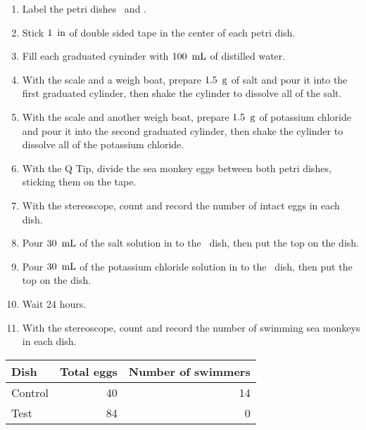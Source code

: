 \documentclass[12pt]{article}
\begin{document}
\begin{enumerate}
    \item Label the petri dishes \control\ and \test.
    \item Stick $1\operatorname{\ in}$ of double sided tape in the center of each petri dish.
    \item Fill each graduated cyninder with $100\operatorname{\ mL}$ of distilled water.
    \item With the scale and a weigh boat, prepare $1.5\operatorname{\ g}$ of salt and pour it into the first graduated cylinder, then shake
    the cylinder to dissolve all of the salt.
    \item With the scale and another weigh boat, prepare $1.5\operatorname{\ g}$ of potassium chloride and pour it into the second graduated
    cylinder, then shake the cylinder to dissolve all of the potassium chloride.
    \item With the Q Tip, divide the sea monkey eggs between both petri dishes, sticking them on the tape.
    \item With the stereoscope, count and record the number of intact eggs in each dish.
    \item Pour $30\operatorname{\ mL}$ of the salt solution in to the \control\ dish, then put the top on the dish.
    \item Pour $30\operatorname{\ mL}$ of the potassium chloride solution in to the \test\ dish, then put the top on the dish.
    \item Wait 24 hours.
    \item With the stereoscope, count and record the number of swimming sea monkeys in each dish.
\end{enumerate}\double

\begin{center}
\begin{tabular}{l|rr}
Dish & Total eggs & Number of swimmers \\
\hline
Control & 40 & 14 \\
Test & 84 & 0 \\
\end{tabular}
\end{center}\double
\end{document}
